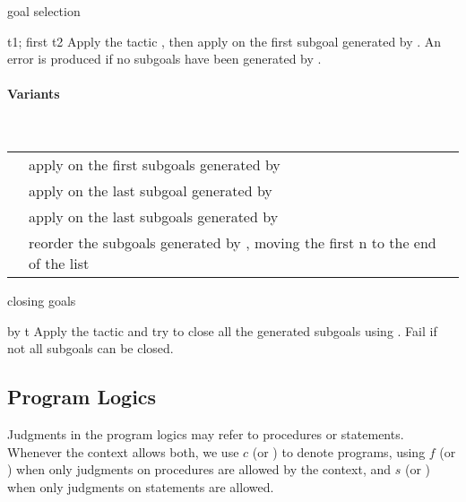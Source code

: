 \begin{tactic}[t1; first t2]{goal selection}
  \begin{tsyntax}[empty]{t1; first t2}
  Apply the tactic , then apply  on the first subgoal
  generated by . An error is produced if no subgoals have been
  generated by .

  \paragraph{Variants}\strut\\

  \noindent\begin{tabularx}{\textwidth}{@{}ll@{}}
  {\ec{t1; first n t2}} & apply {\ec{t2}} on the first {\ec{n}} subgoals
    generated by {\ec{t1}}\\
  {\ec{t1; last t2}} & apply {\ec{t2}} on the last subgoal
    generated by {\ec{t1}}\\
  {\ec{t1; last n t2}} & apply {\ec{t2}} on the last {\ec{n}} subgoals
    generated by {\ec{t1}}\\
  {\ec{t; first n last}} & \parbox{200pt}{reorder the subgoals generated by {}, moving
    the first n to the end of the list}
  \end{tabularx}
  \end{tsyntax}
\end{tactic}

\begin{tactic}[by t]{closing goals}
  \begin{tsyntax}[empty]{by t}
  Apply the tactic  and try to close all the generated subgoals using
  . Fail if not all subgoals can be closed.
  \end{tsyntax}
\end{tactic}

\subsection{Program Logics}

Judgments in the program logics may refer to procedures or
statements. Whenever the context allows both, we use $c$ (or )
to denote programs, using $f$ (or ) when only judgments on
procedures are allowed by the context, and $s$ (or ) when only
judgments on statements are allowed.

